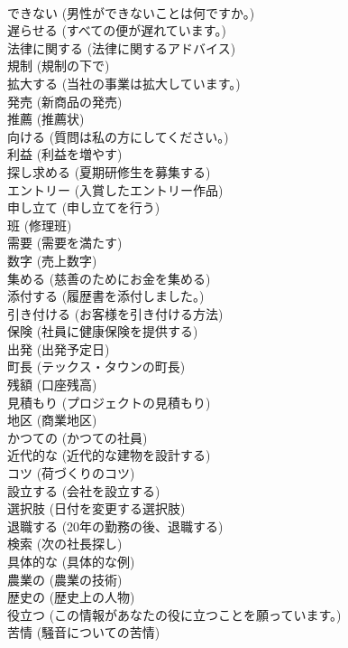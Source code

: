 \documentclass[8pt]{extreport}
\begin{document}
\begin{CJK}{UTF8}{min}
\\	できない	(男性ができないことは何ですか。)		
\\	遅らせる	(すべての便が遅れています。)		
\\	法律に関する	(法律に関するアドバイス)		
\\	規制	(規制の下で)		
\\	拡大する	(当社の事業は拡大しています。)		
\\	発売	(新商品の発売)		
\\	推薦	(推薦状)		
\\	向ける	(質問は私の方にしてください。)		
\\	利益	(利益を増やす)		
\\	探し求める	(夏期研修生を募集する)		
\\	エントリー	(入賞したエントリー作品)		
\\	申し立て	(申し立てを行う)		
\\	班	(修理班)		
\\	需要	(需要を満たす)		
\\	数字	(売上数字)		
\\	集める	(慈善のためにお金を集める)		
\\	添付する	(履歴書を添付しました。)		
\\	引き付ける	(お客様を引き付ける方法)		
\\	保険	(社員に健康保険を提供する)		
\\	出発	(出発予定日)		
\\	町長	(テックス・タウンの町長)		
\\	残額	(口座残高)		
\\	見積もり	(プロジェクトの見積もり)		
\\	地区	(商業地区)		
\\	かつての	(かつての社員)		
\\	近代的な	(近代的な建物を設計する)		
\\	コツ	(荷づくりのコツ)		
\\	設立する	(会社を設立する)		
\\	選択肢	(日付を変更する選択肢)		
\\	退職する	(20年の勤務の後、退職する)		
\\	検索	(次の社長探し)		
\\	具体的な	(具体的な例)		
\\	農業の	(農業の技術)		
\\	歴史の	(歴史上の人物)		
\\	役立つ	(この情報があなたの役に立つことを願っています。)		
\\	苦情	(騒音についての苦情)		

\end{CJK}
\end{document}
